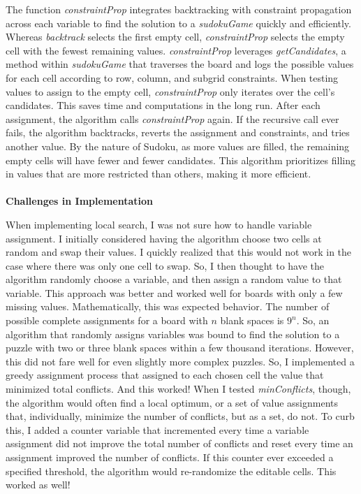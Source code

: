 \documentclass[12pt]{article}
\begin{document}
	The function \textit{constraintProp} integrates backtracking with constraint propagation across each variable to find the solution to a \textit{sudokuGame} quickly and efficiently. Whereas \textit{backtrack} selects the first empty cell, \textit{constraintProp} selects the empty cell with the fewest remaining values. \textit{constraintProp} leverages \textit{getCandidates}, a method within \textit{sudokuGame} that traverses the board and logs the possible values for each cell according to row, column, and subgrid constraints. When testing values to assign to the empty cell, \textit{constraintProp} only iterates over the cell's candidates. This saves time and computations in the long run. After each assignment, the algorithm calls \textit{constraintProp} again. If the recursive call ever fails, the algorithm backtracks, reverts the assignment and constraints, and tries another value. By the nature of Sudoku, as more values are filled, the remaining empty cells will have fewer and fewer candidates. This algorithm prioritizes filling in values that are more restricted than others, making it more efficient.\\\\
\textbf{Challenges in Implementation}
	
	When implementing local search, I was not sure how to handle variable assignment. I initially considered having the algorithm choose two cells at random and swap their values. I quickly realized that this would not work in the case where there was only one cell to swap. So, I then thought to have the algorithm randomly choose a variable, and then assign a random value to that variable. This approach was better and worked well for boards with only a few missing values. Mathematically, this was expected behavior. The number of possible complete assignments for a board with $n$ blank spaces is $9^n$. So, an algorithm that randomly assigns variables was bound to find the solution to a puzzle with two or three blank spaces within a few thousand iterations. However, this did not fare well for even slightly more complex puzzles. So, I implemented a greedy assignment process that assigned to each chosen cell the value that minimized total conflicts. And this worked! When I tested \textit{minConflicts}, though, the algorithm would often find a local optimum, or a set of value assignments that, individually, minimize the number of conflicts, but as a set, do not. To curb this, I added a counter variable that incremented every time a variable assignment did not improve the total number of conflicts and reset every time an assignment improved the number of conflicts. If this counter ever exceeded a specified threshold, the algorithm would re-randomize the editable cells. This worked as well!
	
\end{document}
